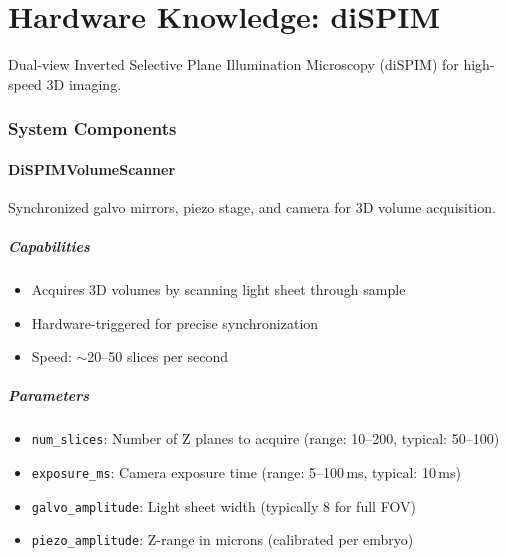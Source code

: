 \documentclass[11pt,letterpaper]{article}
\begin{document}
\newpage


\part*{Hardware Knowledge: diSPIM}

Dual-view Inverted Selective Plane Illumination Microscopy (diSPIM) for high-speed 3D imaging.

\section{System Components}

\subsection{DiSPIMVolumeScanner}

Synchronized galvo mirrors, piezo stage, and camera for 3D volume acquisition.

\subsubsection*{Capabilities}
\begin{itemize}
    \item Acquires 3D volumes by scanning light sheet through sample
    \item Hardware-triggered for precise synchronization
    \item Speed: $\sim$20--50 slices per second
\end{itemize}

\subsubsection*{Parameters}
\begin{itemize}
    \item \texttt{num\_slices}: Number of Z planes to acquire (range: 10--200, typical: 50--100)
    \item \texttt{exposure\_ms}: Camera exposure time (range: 5--100\,ms, typical: 10\,ms)
    \item \texttt{galvo\_amplitude}: Light sheet width (typically 8\textdegree{} for full FOV)
    \item \texttt{piezo\_amplitude}: Z-range in microns (calibrated per embryo)
\end{itemize}
\end{document}
